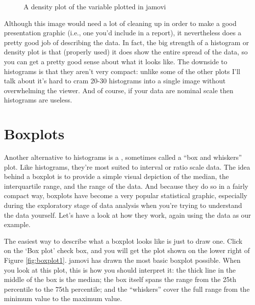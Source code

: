 \begin{figure}[h]
\begin{center}
\caption{A density plot of the  variable plotted in jamovi}
\label{fig:histogram2}
\HR
\end{center}
\end{figure}

Although this image would need a lot of cleaning up in order to make a good presentation graphic (i.e., one you'd include in a report), it nevertheless does a pretty good job of describing the data. In fact, the big strength of a histogram or density plot is that (properly used) it does show the entire spread of the data, so you can get a pretty good sense about what it looks like. The downside to histograms is that they aren't very compact: unlike some of the other plots I'll talk about it's hard to cram 20-30 histograms into a single image without overwhelming the viewer. And of course, if your data are nominal scale then histograms are useless.


\section{Boxplots~\label{sec:boxplots}}

Another alternative to histograms is a , sometimes called a ``box and whiskers'' plot. Like histograms, they're most suited to interval or ratio scale data. The idea behind a boxplot is to provide a simple visual depiction of the median, the interquartile range, and the range of the data. And because they do so in a fairly compact way, boxplots have become a very popular statistical graphic, especially during the exploratory stage of data analysis when you're trying to understand the data yourself. Let's have a look at how they work, again using the  data as our example. 

The easiest way to describe what a boxplot looks like is just to draw one. Click on the `Box plot' check box, and you will get the plot shown on the lower right of Figure \ref{fig:boxplot1}. jamovi has drawn the most basic boxplot possible. When you look at this plot, this is how you should interpret it: the thick line in the middle of the box is the median; the box itself spans the range from the 25th percentile to the 75th percentile; and the ``whiskers'' cover the full range from the minimum value to the maximum value. 

